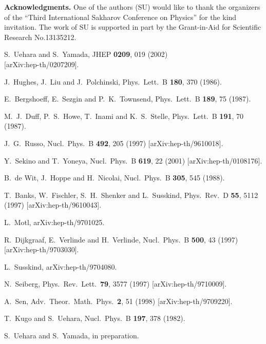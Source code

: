 \documentclass[a4paper,12pt]{article}
\begin{document}
\vspace{\baselineskip}
\noindent
\textbf{Acknowledgments.}
One of the authors (SU) would like to thank the organizers of the
``Third International Sakharov Conference on Physics'' for the kind
invitation. The work of SU is supported in part by the Grant-in-Aid
for Scientific Research No.13135212.

\begin{thebibliography}{99}
S.~Uehara and S.~Yamada,
	JHEP {\bf 0209}, 019 (2002)\\{} [arXiv:hep-th/0207209].

J.~Hughes, J.~Liu and J.~Polchinski,
	Phys.\ Lett.\ B {\bf 180}, 370 (1986).

E.~Bergshoeff, E.~Sezgin and P.~K.~Townsend,
	Phys.\ Lett.\ B {\bf 189}, 75 (1987).

M.~J.~Duff, P.~S.~Howe, T.~Inami and K.~S.~Stelle,
	Phys.\ Lett.\ B {\bf 191}, 70 (1987).

J.~G.~Russo,
	Nucl.\ Phys.\ B {\bf 492}, 205 (1997)
	[arXiv:hep-th/9610018].

Y.~Sekino and T.~Yoneya,
	Nucl.\ Phys.\ B {\bf 619}, 22 (2001)
	[arXiv:hep-th/0108176].

B.~de Wit, J.~Hoppe and H.~Nicolai,
	Nucl.\ Phys.\ B {\bf 305}, 545 (1988).

T.~Banks, W.~Fischler, S.~H.~Shenker and L.~Susskind,
	Phys.\ Rev.\ D {\bf 55}, 5112 (1997)
	[arXiv:hep-th/9610043].

L.~Motl,
	arXiv:hep-th/9701025.

R.~Dijkgraaf, E.~Verlinde and H.~Verlinde,
	Nucl.\ Phys.\ B {\bf 500}, 43 (1997)
	[arXiv:hep-th/9703030].

L.~Susskind,
	arXiv:hep-th/9704080.

 N.~Seiberg,
	Phys.\ Rev.\ Lett.\  {\bf 79}, 3577 (1997)
	[arXiv:hep-th/9710009].

 A.~Sen,
	Adv.\ Theor.\ Math.\ Phys.\  {\bf 2}, 51 (1998)
	[arXiv:hep-th/9709220].

 T.~Kugo and S.~Uehara,
	Nucl.\ Phys.\ B {\bf 197}, 378 (1982).

S.~Uehara and S.~Yamada, in preparation.

\end{thebibliography}
\end{document}
